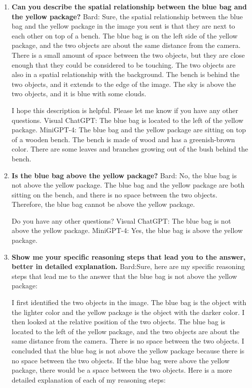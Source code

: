    \begin{enumerate}
        \item \textbf{Can you describe the spatial relationship between the blue bag and the yellow package?}
        \subitem Bard: 
        Sure, the spatial relationship between the blue bag and the yellow package in the image you sent is that they are next to each other on top of a bench. The blue bag is on the left side of the yellow package, and the two objects are about the same distance from the camera. There is a small amount of space between the two objects, but they are close enough that they could be considered to be touching.
        The two objects are also in a spatial relationship with the background. The bench is behind the two objects, and it extends to the edge of the image. The sky is above the two objects, and it is blue with some clouds.

        I hope this description is helpful. Please let me know if you have any other questions.
        \subitem Visual ChatGPT: The blue bag is located to the left of the yellow package.
        \subitem MiniGPT-4: The blue bag and the yellow package are sitting on top of a wooden bench. The bench is made of wood and has a greenish-brown color. There are some leaves and branches growing out of the bush behind the bench.
        \item \textbf{Is the blue bag above the yellow package?}
        \subitem Bard: 
        No, the blue bag is not above the yellow package. The blue bag and the yellow package are both sitting on the bench, and there is no space between the two objects. Therefore, the blue bag cannot be above the yellow package.

        Do you have any other questions?
        \subitem Visual ChatGPT: The blue bag is not above the yellow package.
        \subitem MiniGPT-4: Yes, the blue bag is above the yellow package.
        \item \textbf{Show me your specific reasoning steps that lead you to the answer, better in detailed explanation.}
        \subitem Bard:Sure, here are my specific reasoning steps that lead me to the answer that the blue bag is not above the yellow package:

        I first identified the two objects in the image. The blue bag is the object with the lighter color and the yellow package is the object with the darker color.
        I then looked at the relative position of the two objects. The blue bag is located to the left of the yellow package, and the two objects are about the same distance from the camera. There is no space between the two objects.
        I concluded that the blue bag is not above the yellow package because there is no space between the two objects. If the blue bag were above the yellow package, there would be a space between the two objects.
        Here is a more detailed explanation of each of my reasoning steps:
        

\end{enumerate}
